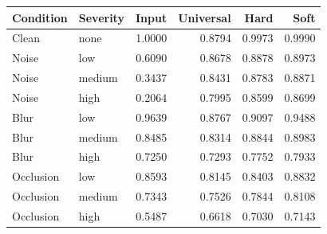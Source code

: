 \begin{tabular}{llrrrr}\toprule Condition & Severity & Input & Universal & Hard & Soft\\\midrule
Clean & none & 1.0000 & 0.8794 & 0.9973 & 0.9990\\
Noise & low & 0.6090 & 0.8678 & 0.8878 & 0.8973\\
Noise & medium & 0.3437 & 0.8431 & 0.8783 & 0.8871\\
Noise & high & 0.2064 & 0.7995 & 0.8599 & 0.8699\\
Blur & low & 0.9639 & 0.8767 & 0.9097 & 0.9488\\
Blur & medium & 0.8485 & 0.8314 & 0.8844 & 0.8983\\
Blur & high & 0.7250 & 0.7293 & 0.7752 & 0.7933\\
Occlusion & low & 0.8593 & 0.8145 & 0.8403 & 0.8832\\
Occlusion & medium & 0.7343 & 0.7526 & 0.7844 & 0.8108\\
Occlusion & high & 0.5487 & 0.6618 & 0.7030 & 0.7143\\
\bottomrule\end{tabular}